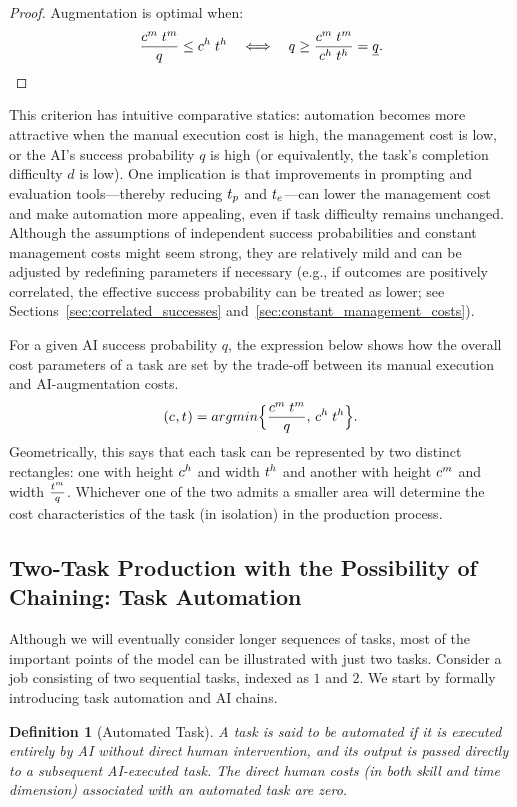\documentclass{article}
\theoremstyle{plain}
\theoremstyle{plain}
\newtheorem{definition}[theorem]{Definition}
\begin{document}
\begin{proof}
Augmentation is optimal when:
$$\frac{c^{m}_{} \; t^{m}_{}}{q} \leq c^{h}_{} \; t^{h}_{} \quad \Longleftrightarrow \quad q \geq \frac{c^{m}_{} \; t^{m}_{}}{c^{h}_{} \; t^{h}_{}} = \underline{q}.$$
\end{proof}

This criterion has intuitive comparative statics: automation becomes more attractive when the manual execution cost is high, the management cost is low, or the AI's success probability $q$ is high (or equivalently, the task's completion difficulty $d$ is low).
One implication is that improvements in prompting and evaluation tools---thereby reducing $t_{p}$ and $t_{e}$---can lower the management cost and make automation more appealing, even if task difficulty remains unchanged.
Although the assumptions of independent success probabilities and constant management costs might seem strong, they are relatively mild and can be adjusted by redefining parameters if necessary (e.g., if outcomes are positively correlated, the effective success probability can be treated as lower; see Sections~\ref{sec:correlated_successes} and~\ref{sec:constant_management_costs}).

For a given AI success probability $q$, the expression below shows how the overall cost parameters of a task are set by the trade-off between its manual execution and AI-augmentation costs.
$$(c_{}, t_{}) = argmin \Bigl\{\frac{c^{m}_{} \; t^{m}_{}}{q},\, c^{h}_{} \; t^{h}_{}\Bigr\}.$$
Geometrically, this says that each task can be represented by two distinct rectangles: one with height $c^{h}_{}$ and width $t^{h}_{}$ and another with height $c^{m}_{}$ and width $\frac{t^{m}_{}}{q}$.
Whichever one of the two admits a smaller area will determine the cost characteristics of the task (in isolation) in the production process.



\subsection{Two-Task Production with the Possibility of Chaining: Task Automation}
Although we will eventually consider longer sequences of tasks, most of the important points of the model can be illustrated with just two tasks.
Consider a job consisting of two sequential tasks, indexed as $1$ and $2$.
We start by formally introducing task automation and AI chains.
\begin{definition}[Automated Task]
\label{def:automated_task}
A task is said to be automated if it is executed entirely by AI without direct human intervention, and its output is passed directly to a subsequent AI-executed task.
The direct human costs (in both skill and time dimension) associated with an automated task are zero.
\end{definition}
\end{document}
